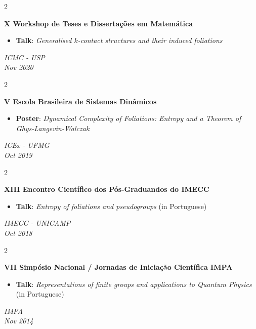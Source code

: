 \documentclass[10pt, letterpaper]{article}
\newenvironment{highlights}{
    \begin{itemize}[
        topsep=0.10 cm,
        parsep=0.10 cm,
        partopsep=0pt,
        itemsep=0pt,
        leftmargin=0.4 cm + 10pt
    ]
}{
    \end{itemize}
} %
\newenvironment{twocolentry}[2][]{
    \onecolentry
    \def\secondColumn{#2}
    \setcolumnwidth{\fill, 5 cm}
    \begin{paracol}{2}
    \small 
}{
    \switchcolumn \raggedleft \secondColumn
    \end{paracol}
    \endonecolentry
} %
\begin{document}
    \begin{twocolentry}{\textit{ICMC - USP \\ Nov 2020}}
        \textbf{X Workshop de Teses e Dissertações em Matemática}
        \begin{highlights}
            \item \textbf{Talk}: \textit{Generalised \(k\)-contact structures and their induced foliations}
        \end{highlights}
    \end{twocolentry} \vspace{0.1cm}
    
    \begin{twocolentry}{\textit{ICEx - UFMG \\ Oct 2019}}
        \textbf{V Escola Brasileira de Sistemas Dinâmicos}
        \begin{highlights}
            \item \textbf{Poster}: \textit{Dynamical Complexity of Foliations: Entropy and a Theorem of Ghys-Langevin-Walczak}
        \end{highlights}
    \end{twocolentry} \vspace{0.1cm}
    
    \begin{twocolentry}{\textit{IMECC - UNICAMP \\ Oct 2018}}
        \textbf{XIII Encontro Científico dos Pós-Graduandos do IMECC}
        \begin{highlights}
            \item \textbf{Talk}: \textit{Entropy of foliations and pseudogroups} (in Portuguese)
        \end{highlights}
    \end{twocolentry} \vspace{0.1cm}
    
    \begin{twocolentry}{\textit{IMPA \\ Nov 2014}}
        \textbf{VII Simpósio Nacional / Jornadas de Iniciação Científica IMPA}
        \begin{highlights}
            \item \textbf{Talk}: \textit{Representations of finite groups and applications to Quantum Physics} (in Portuguese)
        \end{highlights}
    \end{twocolentry} \vspace{0.1cm}
    
\end{document}

